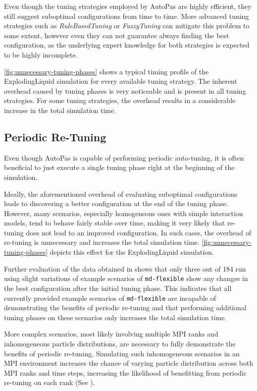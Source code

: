 \documentclass[conference]{IEEEtran}
\begin{document}
Even though the tuning strategies employed by AutoPas are highly efficient, they still suggest suboptimal configurations from time to time. More advanced tuning strategies such as \textit{RuleBasedTuning} or \textit{FuzzyTuning} can mitigate this problem to some extent, however even they can not guarantee always finding the best configuration, as the underlying expert knowledge for both strategies is expected to be highly incomplete.

\autoref{fig:unnecessary-tuning-phases} shows a typical timing profile of the ExplodingLiquid simulation for every available tuning strategy. The inherent overhead caused by tuning phases is very noticeable and is present in all tuning strategies. For some tuning strategies, the overhead results in a considerable increase in the total simulation time.

\subsection*{Periodic Re-Tuning}

Even though AutoPas is capable of performing periodic auto-tuning, it is often beneficial to just execute a single tuning phase right at the beginning of the simulation.

Ideally, the aforementioned overhead of evaluating suboptimal configurations leads to discovering a better configuration at the end of the tuning phase. However, many scenarios, especially homogeneous ones with simple interaction models, tend to behave fairly stable over time, making it very likely that re-tuning does not lead to an improved configuration. In such cases, the overhead of re-tuning is unnecessary and increases the total simulation time. \autoref{fig:unnecessary-tuning-phases} depicts this effect for the ExplodingLiquid simulation.

Further evaluation of the data obtained in \cite{lerchner2024} shows that only three out of 184 run using slight variations of example scenarios of \texttt{md-flexible} show any changes in the best configuration after the initial tuning phase. This indicates that all currently provided example scenarios of \texttt{md-flexible} are incapable of demonstrating the benefits of periodic re-tuning and that performing additional tuning phases on these scenarios only increases the total simulation time.

More complex scenarios, most likely involving multiple MPI ranks and inhomogeneous particle distributions, are necessary to fully demonstrate the benefits of periodic re-tuning. Simulating such inhomogeneous scenarios in an MPI environment increases the chance of varying particle distribution across both MPI ranks and time steps, increasing the likelihood of benefitting from periodic re-tuning on each rank (See \cite{Newcome2023Poster}).
\end{document}
